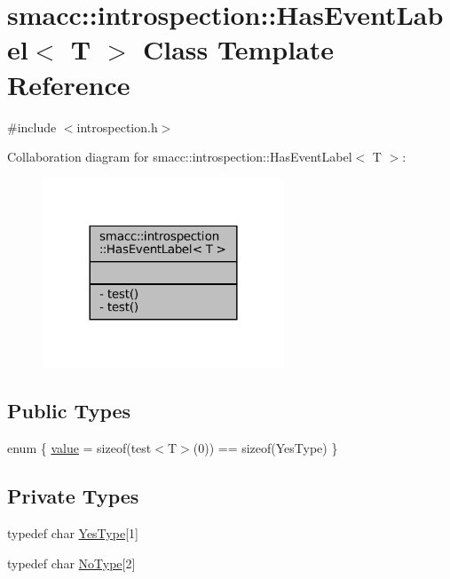 \hypertarget{classsmacc_1_1introspection_1_1HasEventLabel}{}\section{smacc\+:\+:introspection\+:\+:Has\+Event\+Label$<$ T $>$ Class Template Reference}
\label{classsmacc_1_1introspection_1_1HasEventLabel}


{\ttfamily \#include $<$introspection.\+h$>$}



Collaboration diagram for smacc\+:\+:introspection\+:\+:Has\+Event\+Label$<$ T $>$\+:
\nopagebreak
\begin{figure}[H]
\begin{center}
\leavevmode
\includegraphics[width=204pt]{classsmacc_1_1introspection_1_1HasEventLabel__coll__graph}
\end{center}
\end{figure}
\subsection*{Public Types}
\begin{DoxyCompactItemize}
\item 
enum \{ \hyperlink{classsmacc_1_1introspection_1_1HasEventLabel_a2de6073f80d42739c5ed78d301bd853ba3f57db3ac5b424aedec54eb89e48b732}{value} = sizeof(test$<$T$>$(0)) == sizeof(Yes\+Type)
 \}
\end{DoxyCompactItemize}
\subsection*{Private Types}
\begin{DoxyCompactItemize}
\item 
typedef char \hyperlink{classsmacc_1_1introspection_1_1HasEventLabel_a8d4b4c2ecb640812e11e8c1407636b6a}{Yes\+Type}\mbox{[}1\mbox{]}
\item 
typedef char \hyperlink{classsmacc_1_1introspection_1_1HasEventLabel_a91b6dd8a7c59c7f24ef0937c99026e81}{No\+Type}\mbox{[}2\mbox{]}
\end{DoxyCompactItemize}
